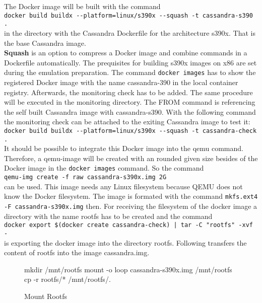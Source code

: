 The Docker image will be built with the command  \\
\lstinline!docker build buildx --platform=linux/s390x --squash -t cassandra-s390 .! \\
in the directory with the Cassandra Dockerfile  for the architecture s390x. That is the base Cassandra image.\\
\textbf{Squash} is an option to compress a Docker image and combine commands in a Dockerfile automatically. The prequisites for building s390x images on x86 are set during the emulation preparation. The command \lstinline!docker images! has to show the registered Docker image with the name cassandra-390 in the local container registry. Afterwards, the monitoring check has to be added. 
The same procedure will be executed in the monitoring directory. The FROM command is referencing the self built Cassandra image with cassandra-s390. With the following command the monitoring check can be attached to the exiting Cassandra image to test it: \\
\lstinline!docker build buildx --platform=linux/s390x --squash -t cassandra-check .! \\
It should be possible to integrate this Docker image into the qemu command. Therefore, a qemu-image will be created with an rounded given size besides of the Docker image in the  \lstinline!docker images! command. So the command \\  
\lstinline!qemu-img create -f raw cassandra-s390x.img 2G!  \\
can be used. This image needs any Linux filesystem because QEMU does not know the Docker filesystem. The image is formated with the command  \lstinline!mkfs.ext4 -F cassandra-s390x.img! then. For receiving the filesystem of the docker image a directory with the name rootfs has to be created and the command \\
\lstinline!docker export $(docker create cassandra-check) | tar -C "rootfs" -xvf -!  \\ 
is exporting the docker image into the directory rootfs. Following transfers the content of rootfs into the image cassandra.img.

\begin{figure}[H]
\centering
\begin{boxedverbatim}
mkdir /mnt/rootfs
mount -o loop cassandra-s390x.img /mnt/rootfs
cp -r rootfs/* /mnt/rootfs/.
\end{boxedverbatim}
 \caption{Mount Rootfs}
    \label{Mount-Rootfs}
\end{figure}

